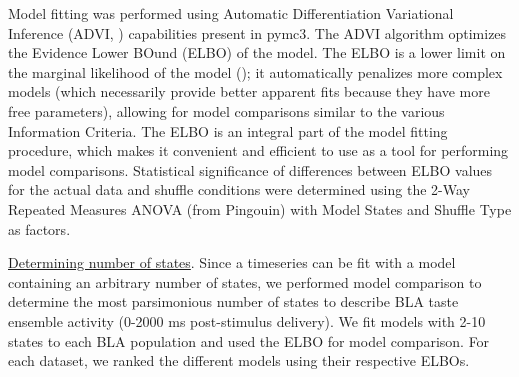\begin{refsection}
Model fitting was performed using Automatic Differentiation Variational Inference (ADVI, \cite{kucukelbir2016a}) capabilities present in pymc3. The ADVI algorithm optimizes the Evidence Lower BOund (ELBO) of the model. The ELBO is a lower limit on the marginal likelihood of the model (\cite{blei2017a}); it automatically penalizes more complex models (which necessarily provide better apparent fits because they have more free parameters), allowing for model comparisons similar to the various Information Criteria. The ELBO is an integral part of the model fitting procedure, which makes it convenient and efficient to use as a tool for performing model comparisons. Statistical significance of differences between ELBO values for the actual data and shuffle conditions were determined using the 2-Way Repeated Measures ANOVA (from Pingouin) with Model States and Shuffle Type as factors.

\noindent\underline{Determining number of states}. Since a timeseries can be fit with a model containing an arbitrary number of states, we performed model comparison to determine the most parsimonious number of states to describe BLA taste ensemble activity (0-2000 ms post-stimulus delivery). We fit models with 2-10 states to each BLA population and used the ELBO for model comparison.  For each dataset, we ranked the different models using their respective ELBOs. 


\end{refsection}
